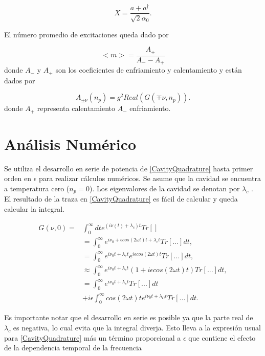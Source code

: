 \documentclass[10pt,a4paper]{report}
\begin{document}
\begin{equation}
X = \frac{a + a^\dagger}{\sqrt{2}\alpha_0}.
\end{equation}

El número promedio de excitaciones queda dado por

\begin{equation}
<m> = \frac{A_+}{A_- - A_+}
\end{equation} donde $A_-$ y $A_+$ son los coeficientes de enfriamiento y calentamiento y están dados por


\begin{equation}
A_{\pm \nu}(n_p) = g^2Real(G(\mp \nu,n_p)).
\end{equation} donde $A_+$ representa calentamiento $A_-$ enfriamiento.


\section{Análisis Numérico}

Se utiliza el desarrollo en serie de potencia de
\eqref{CavityQuadrature} hasta primer orden en $\epsilon$ para
realizar cálculos numéricos. Se asume que la cavidad se encuentra a
temperatura cero ($n_p=0$). Los eigenvalores de la cavidad se denotan
por $\lambda_c$ . El resultado de la traza en \eqref{CavityQuadrature} es fácil de calcular y queda calcular la integral.

\begin{align}
G(\nu,0)=&\int_0^\infty dt e^{(i\nu(t)+\lambda_c) t}Tr[]\\
&= \int_0^\infty e^{i \nu_0 + \epsilon cos(2\omega t) t + \lambda_c t} Tr[...]dt, \\
&=\int_0^\infty e^{i \nu_0 t + \lambda_c t}e^{i \epsilon cos(2\omega t)t} Tr[...]dt, \\
&\approx \int_0^\infty e^{i \nu_0 t + \lambda_c t}(1+i \epsilon cos(2\omega t)t) Tr[...]dt, \\
&=\int_0^\infty e^{i \nu_0 t + \lambda_c t}Tr[...]dt\\
&+i\epsilon\int_0^\infty cos(2\omega t)t e^{i \nu_0 t + \lambda_C t}Tr[...]dt.
\end{align}


Es importante notar que el desarrollo en serie es posible ya que la parte real de $\lambda_c$ es negativa, lo cual evita que la integral diverja. Esto lleva a la expresión usual para \ref{CavityQuadrature} más un término proporcional a $\epsilon$ que contiene el efecto de la dependencia temporal de la frecuencia
\end{document}
